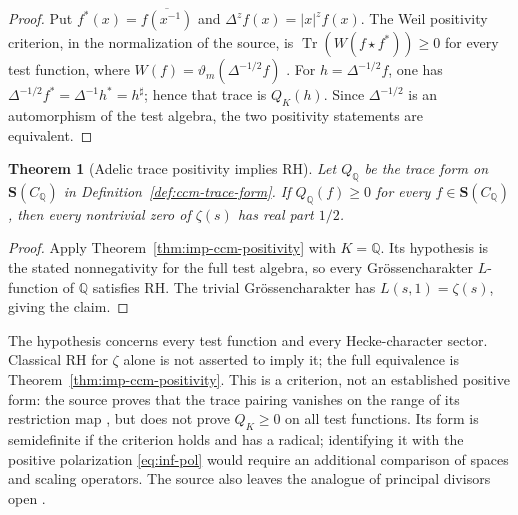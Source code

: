 \documentclass[11pt]{amsart}
\theoremstyle{plain}
\newtheorem{theorem}{Theorem}[section]
\theoremstyle{definition}
\theoremstyle{remark}
\numberwithin{equation}{section}
\newcommand{\Q}{\mathbb{Q}}
\begin{document}
\begin{proof}
Put $f^*(x)=\overline{f(x^{-1})}$ and
$\Delta^z f(x)=|x|^z f(x)$. The Weil positivity criterion, in the
normalization of the source, is
\(\operatorname{Tr}(W(f\star f^*))\ge0\) for every test function,
where $W(f)=\vartheta_m(\Delta^{-1/2}f)$
\cite[Proposition~6.2, p.~29]{ConnesConsaniMarcolli2009Weil}.
For $h=\Delta^{-1/2}f$, one has
$\Delta^{-1/2}f^*=\Delta^{-1}h^*=h^\sharp$; hence that trace is
$Q_K(h)$. Since $\Delta^{-1/2}$ is an automorphism of the test
algebra, the two positivity statements are equivalent.
\end{proof}

\begin{theorem}[Adelic trace positivity implies RH]
\label{thm:ccm-positivity-rh}
Let $Q_{\Q}$ be the trace form on $\mathbf S(C_{\Q})$ in
Definition~\ref{def:ccm-trace-form}. If $Q_{\Q}(f)\ge0$ for every
$f\in\mathbf S(C_{\Q})$, then every nontrivial zero of $\zeta(s)$
has real part $1/2$.
\end{theorem}

\begin{proof}
Apply Theorem~\ref{thm:imp-ccm-positivity} with $K=\Q$.
Its hypothesis is the stated nonnegativity for the full test algebra,
so every Gr\"ossencharakter $L$-function of $\Q$ satisfies RH.
The trivial Gr\"ossencharakter has $L(s,1)=\zeta(s)$, giving the
claim.
\end{proof}

The hypothesis concerns every test function and every Hecke-character
sector. Classical RH for $\zeta$ alone is not asserted to imply it;
the full equivalence is Theorem~\ref{thm:imp-ccm-positivity}.
This is a criterion, not an established positive form: the source
proves that the trace pairing vanishes on the range of its restriction
map \cite[Proposition~6.4, pp.~29--30]%
{ConnesConsaniMarcolli2009Weil}, but does not prove $Q_K\ge0$ on all
test functions. Its form is semidefinite if the criterion holds and
has a radical; identifying it with the positive polarization
\eqref{eq:inf-pol} would require an additional comparison of spaces
and scaling operators. The source also leaves the analogue of
principal divisors open \cite[p.~4]{ConnesConsaniMarcolli2009Weil}.
\end{document}
